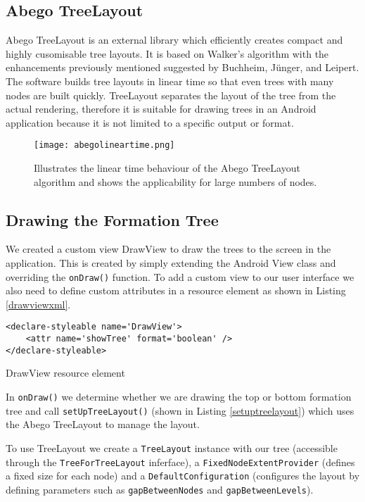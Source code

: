 \documentclass{report}
\begin{document}
\subsection{Abego TreeLayout}

Abego TreeLayout is an external library which efficiently creates compact and highly cusomisable tree layouts. It is based on Walker's algorithm with the enhancements previously mentioned suggested by Buchheim, J\"unger, and Leipert\cite{treelayoutlineartime}. The software builds tree layouts in linear time so that even trees with many nodes are built quickly. TreeLayout separates the layout of the tree from the actual rendering, therefore it is suitable for drawing trees in an Android application because it is not limited to a specific output or format.

\begin{figure}[ht]
    \centering
    \texttt{[image: abegolineartime.png]}
    \caption{Illustrates the linear time behaviour of the Abego TreeLayout algorithm\cite{abegolineartime} and shows the applicability for large numbers of nodes.}
    \label{abegolineartime}
\end{figure}

\subsection{Drawing the Formation Tree}

We created a custom view DrawView to draw the trees to the screen in the application. This is created by simply extending the Android View class and overriding the {\tt onDraw()} function. To add a custom view to our user interface we also need to define custom attributes in a resource element as shown in Listing \ref{drawviewxml}.

\begin{listing}[ht]
\begin{verbatim}
<declare-styleable name='DrawView'>
    <attr name='showTree' format='boolean' />
</declare-styleable>
\end{verbatim}
\caption{DrawView resource element}
\label{drawviewxml}
\end{listing}

In {\tt onDraw()} we determine whether we are drawing the top or bottom formation tree and call {\tt setUpTreeLayout()} (shown in Listing \ref{setuptreelayout}) which uses the Abego TreeLayout to manage the layout.

To use TreeLayout we create a {\tt TreeLayout} instance with our tree (accessible through the {\tt TreeForTreeLayout} inferface), a {\tt FixedNodeExtentProvider} (defines a fixed size for each node) and a {\tt DefaultConfiguration} (configures the layout by defining parameters such as {\tt gapBetweenNodes} and {\tt gapBetweenLevels}).
\end{document}

